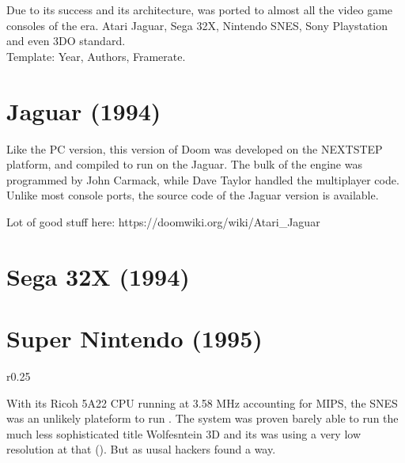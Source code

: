 Due to its success and its architecture, \doom was ported to almost all the video game consoles of the era. Atari Jaguar, Sega 32X, Nintendo SNES, Sony Playstation and even 3DO standard.\\

Template: Year, Authors, Framerate.

\section{Jaguar (1994)}
Like the PC version, this version of Doom was developed on the NEXTSTEP platform, and compiled to run on the Jaguar. The bulk of the engine was programmed by John Carmack, while Dave Taylor handled the multiplayer code. Unlike most console ports, the source code of the Jaguar version is available.\\
\par
Lot of good stuff here: https://doomwiki.org/wiki/Atari\_Jaguar\\
\par
{}


\section{Sega 32X (1994)}



\section{Super Nintendo (1995)}
\begin{wrapfigure}[11]{r}{0.25\textwidth}
\centering
{}
\end{wrapfigure}
With its Ricoh 5A22 CPU running at 3.58 MHz accounting for \fixme{} MIPS, the SNES was an unlikely plateform to run \doom. The system was proven barely able to run the much less sophisticated title Wolfesntein 3D and its was using a very low resolution at that (\fixme{}). But as uusal hackers found a way.\\
\par


